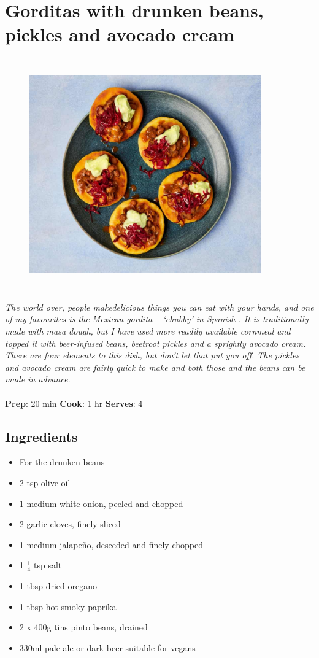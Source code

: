 \documentclass{book}
\begin{document}
\section{Gorditas with drunken beans, pickles and avocado cream}
\begin{figure}
\centering\includegraphics[width=10cm,height=10cm,keepaspectratio]{Recipe_Pictures/Gorditas_with_drunken_beans,_pickles_and_avocado_cream.png}
\end{figure}
\emph{The world over, people makedelicious things you can eat with your hands, and one of my favourites is the Mexican gordita – ‘chubby’ in Spanish . It is traditionally made with masa dough, but I have used more readily available cornmeal and topped it with beer-infused beans, beetroot pickles and a sprightly avocado cream.\\ 
There are four elements to this dish, but don’t let that put you off. The pickles and avocado cream are fairly quick to make and both those and the beans can be made in advance.}\\\\ 
\textbf{Prep}: 20 min
\textbf{Cook}: 1 hr
\textbf{Serves}: 4
\subsection*{Ingredients}
\begin{itemize}
\item For the drunken beans
\item 2 tsp olive oil
\item 1 medium white onion, peeled and chopped
\item 2 garlic cloves, finely sliced
\item 1 medium jalapeño, deseeded and finely chopped
\item 1 $\frac{1}{4}$ tsp salt
\item 1 tbsp dried oregano
\item 1 tbsp hot smoky paprika
\item 2 x 400g tins pinto beans, drained
\item 330ml pale ale or dark beer suitable for vegans
\end{itemize}
\end{document}
